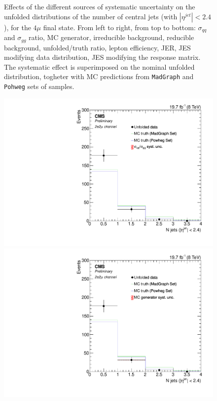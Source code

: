 \begin{figure}[hbtp]
\begin{center}
    \caption{Effects of the different sources of systematic uncertainty on the unfolded distributions of the number of central jets (with $|\eta^{jet}|<2.4$), for the     
    $4\mu$ final state. From left to right, from top to bottom: $\sigma_{qq}$ and $\sigma_{gg}$ ratio, MC generator, irreducible background,
reducible background, unfolded/truth ratio, lepton efficiency, JER, JES modifying data distribution, JES modifying the response matrix. The systematic effect is superimposed on the nominal unfolded distribution, togheter with MC predictions from \texttt{MadGraph} and \texttt{Pohweg} sets of samples.}
    \label{fig:CentralJets_syst_4m}
  \end{center}
\end{figure}

\begin{figure}[hbtp]
  \begin{center}
    \includegraphics[width=0.8\cmsFigWidth]{Figures/Unfolding/Systematics/ZZTo2e2m_CentralJets_qqgg_Mad_fr}     
    \includegraphics[width=0.8\cmsFigWidth]{Figures/Unfolding/Systematics/ZZTo2e2m_CentralJets_MCgen_Mad_fr}     

\end{center}
\end{figure}
